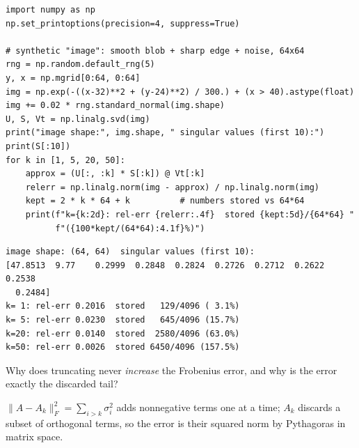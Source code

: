 \begin{lstlisting}[caption={\ttfamily code/ch10\_image\_compress.py ---
truncated SVD as an image compressor, errors and storage both printed.}]
import numpy as np
np.set_printoptions(precision=4, suppress=True)

# synthetic "image": smooth blob + sharp edge + noise, 64x64
rng = np.random.default_rng(5)
y, x = np.mgrid[0:64, 0:64]
img = np.exp(-((x-32)**2 + (y-24)**2) / 300.) + (x > 40).astype(float)
img += 0.02 * rng.standard_normal(img.shape)
U, S, Vt = np.linalg.svd(img)
print("image shape:", img.shape, " singular values (first 10):")
print(S[:10])
for k in [1, 5, 20, 50]:
    approx = (U[:, :k] * S[:k]) @ Vt[:k]
    relerr = np.linalg.norm(img - approx) / np.linalg.norm(img)
    kept = 2 * k * 64 + k          # numbers stored vs 64*64
    print(f"k={k:2d}: rel-err {relerr:.4f}  stored {kept:5d}/{64*64} "
          f"({100*kept/(64*64):4.1f}%)")
\end{lstlisting}

\begin{lstlisting}[caption={Output of the compressor. Notice
$\sigma_1=47.9$ then $\sigma_2=9.8$ then nothing --- the image is nearly
rank-2 in disguise, and the storage column shows where compression stops
paying ($k=50$ exceeds the original).}]
image shape: (64, 64)  singular values (first 10):
[47.8513  9.77    0.2999  0.2848  0.2824  0.2726  0.2712  0.2622  0.2538
  0.2484]
k= 1: rel-err 0.2016  stored   129/4096 ( 3.1%)
k= 5: rel-err 0.0230  stored   645/4096 (15.7%)
k=20: rel-err 0.0140  stored  2580/4096 (63.0%)
k=50: rel-err 0.0026  stored 6450/4096 (157.5%)
\end{lstlisting}

\begin{exercise}[medium]
Why does truncating never \emph{increase} the Frobenius error, and why is
the error exactly the discarded tail?
\begin{solution}
$\lVert A-A_k\rVert_F^2=\sum_{i>k}\sigma_i^2$ adds nonnegative terms one
at a time; $A_k$ discards a subset of orthogonal terms, so the error is
their squared norm by Pythagoras in matrix space.
\end{solution}
\end{exercise}

